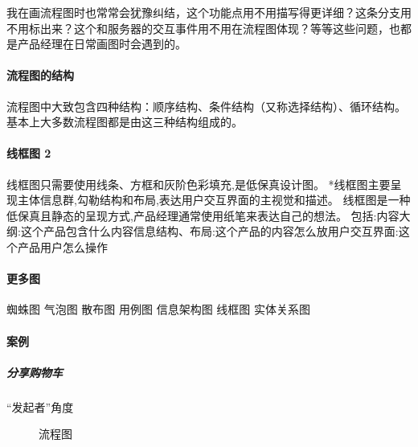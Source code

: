 \documentclass[letterpaper,11pt,english]{sphinxmanual}
\begin{document}
我在画流程图时也常常会犹豫纠结，这个功能点用不用描写得更详细？这条分支用不用标出来？这个和服务器的交互事件用不用在流程图体现？等等这些问题，也都是产品经理在日常画图时会遇到的。


\paragraph{流程图的结构}
\label{\detokenize{chapter_skill/flow_chart:id9}}
流程图中大致包含四种结构：顺序结构、条件结构（又称选择结构）、循环结构。基本上大多数流程图都是由这三种结构组成的。


\paragraph{线框图 2\sphinxfootnotemark[197]}
\label{\detokenize{chapter_skill/flow_chart:id10}}%
\begin{footnotetext}[197]\sphinxAtStartFootnote
{}
%
\end{footnotetext}\ignorespaces 
线框图只需要使用线条、方框和灰阶色彩填充,是低保真设计图。
*线框图主要呈现主体信息群,勾勒结构和布局,表达用户交互界面的主视觉和描述。
线框图是一种低保真且静态的呈现方式,产品经理通常使用纸笔来表达自己的想法。
包括:内容大纲:这个产品包含什么内容信息结构、布局:这个产品的内容怎么放用户交互界面:这个产品用户怎么操作


\paragraph{更多图}
\label{\detokenize{chapter_skill/flow_chart:id11}}
蜘蛛图 气泡图 散布图 用例图 信息架构图 线框图
实体关系图%
\begin{footnote}[198]\sphinxAtStartFootnote
{}
%
\end{footnote}


\paragraph{案例}
\label{\detokenize{chapter_skill/flow_chart:id12}}

\subparagraph{分享购物车}
\label{\detokenize{chapter_skill/flow_chart:id13}}
“发起者”角度

\begin{figure}[H]
\centering
\capstart

\noindent{}
\caption{流程图}\label{\detokenize{chapter_skill/flow_chart:id19}}\end{figure}
\end{document}
